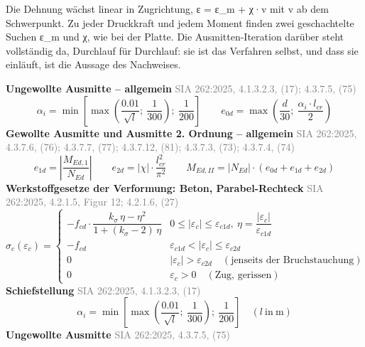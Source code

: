 \documentclass[11pt,a4paper]{article}
\newcommand{\normref}[1]{{\small\textcolor{gray}{#1}}}
\begin{document}
Die Dehnung wächst linear in Zugrichtung, ε = ε\_m + χ·v mit v ab dem Schwerpunkt. Zu jeder Druckkraft und jedem Moment finden zwei geschachtelte Suchen ε\_m und χ, wie bei der Platte. Die Ausmitten-Iteration darüber steht vollständig da, Durchlauf für Durchlauf: sie ist das Verfahren selbst, und dass sie einläuft, ist die Aussage des Nachweises.

\noindent\textbf{Ungewollte Ausmitte – allgemein} \hfill \normref{SIA 262:2025, 4.1.3.2.3, (17); 4.3.7.5, (75)}
\begin{equation*}
\alpha_i = \min\left[\max\left(\frac{0.01}{\sqrt{l}};\ \frac{1}{300}\right);\ \frac{1}{200}\right] \qquad e_{0d} = \max\left(\frac{d}{30};\ \frac{\alpha_i \cdot l_{cr}}{2}\right)
\end{equation*}
\noindent\textbf{Gewollte Ausmitte und Ausmitte 2. Ordnung – allgemein} \hfill \normref{SIA 262:2025, 4.3.7.6, (76); 4.3.7.7, (77); 4.3.7.12, (81); 4.3.7.3, (73); 4.3.7.4, (74)}
\begin{equation*}
e_{1d} = \left|\frac{M_{Ed,1}}{N_{Ed}}\right| \qquad e_{2d} = \left|\chi\right| \cdot \frac{l_{cr}^{2}}{\pi^{2}} \qquad M_{Ed,II} = \left|N_{Ed}\right| \cdot \left(e_{0d} + e_{1d} + e_{2d}\right)
\end{equation*}
\noindent\textbf{Werkstoffgesetze der Verformung: Beton, Parabel-Rechteck} \hfill \normref{SIA 262:2025, 4.2.1.5, Figur 12; 4.2.1.6, (27)}
\begin{equation*}
\sigma_c(\varepsilon_c) = \begin{cases} -f_{cd} \cdot \dfrac{k_\sigma\,\eta - \eta^2}{1 + (k_\sigma - 2)\,\eta} & 0 \le |\varepsilon_c| \le \varepsilon_{c1d},\ \eta = \dfrac{|\varepsilon_c|}{\varepsilon_{c1d}} \\[2ex] -f_{cd} & \varepsilon_{c1d} < |\varepsilon_c| \le \varepsilon_{c2d} \\[1ex] 0 & |\varepsilon_c| > \varepsilon_{c2d} \quad (\text{jenseits der Bruchstauchung}) \\[1ex] 0 & \varepsilon_c > 0 \quad (\text{Zug, gerissen}) \end{cases}
\end{equation*}
\noindent\textbf{Schiefstellung} \hfill \normref{SIA 262:2025, 4.1.3.2.3, (17)}
\begin{equation*}
\alpha_i = \min\left[\max\left(\frac{0.01}{\sqrt{l}};\ \frac{1}{300}\right);\ \frac{1}{200}\right] \quad \left(l\ \text{in}\ \mathrm{m}\right)
\end{equation*}
\noindent\textbf{Ungewollte Ausmitte} \hfill \normref{SIA 262:2025, 4.3.7.5, (75)}
\end{document}
